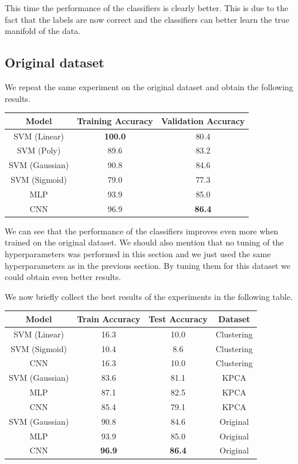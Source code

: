 This time the performance of the classifiers is clearly better. This is
due to the fact that the labels are now correct and the classifiers can
better learn the true manifold of the data.

\subsection{Original dataset}
We repeat the same experiment on the original dataset and obtain the
following results.
\begin{table}[H]
    \centering
    \begin{tabular}{|c|c|c|}
        \hline
        Model          & Training Accuracy & Validation Accuracy \\
        \hline
        SVM (Linear)   & \textbf{100.0} & 80.4 \\
        SVM (Poly)     & 89.6 & 83.2 \\
        SVM (Gaussian) & 90.8 & 84.6 \\
        SVM (Sigmoid)  & 79.0 & 77.3 \\
        MLP            & 93.9 & 85.0 \\
        CNN            & 96.9 & \textbf{86.4} \\
        \hline
    \end{tabular}
\end{table}
We can see that the performance of the classifiers improves even more
when trained on the original dataset. We should also mention that no 
tuning of the hyperparameters was performed in this section and we 
just used the same hyperparameters as in the previous section.
By tuning them for this dataset we could obtain even better results.

We now briefly collect the best results of the experiments in the following table.
\begin{table}[H]
    \centering
    \begin{tabular}{|c|c|c|c|}
        \hline
        Model          & Train Accuracy & Test Accuracy & Dataset \\
        \hline
        SVM (Linear)   & 16.3 & 10.0 & Clustering \\
        SVM (Sigmoid)  & 10.4 & 8.6 & Clustering \\
        CNN            & 16.3 & 10.0 & Clustering \\
        \hline
        SVM (Gaussian) & 83.6 & 81.1 & KPCA \\
        MLP            & 87.1 & 82.5 & KPCA \\
        CNN            & 85.4 & 79.1 & KPCA \\
        \hline
        SVM (Gaussian) & 90.8 & 84.6 & Original \\
        MLP            & 93.9 & 85.0 & Original \\
        CNN            & \textbf{96.9} & \textbf{86.4} & Original \\
        \hline
    \end{tabular}
\end{table}


